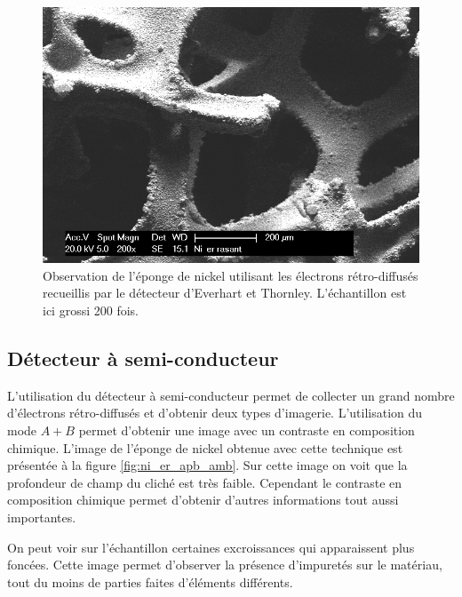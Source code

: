 \documentclass[a4paper,12pt]{article}
\newcommand\ett{Everhart et Thornley\xspace}
\begin{document}
\begin{figure}
\centering
\includegraphics[width = 0.7 \textwidth]{images/ni_er_rasant.png}
\caption{Observation de l'éponge de nickel utilisant les électrons rétro-diffusés recueillis par le détecteur d'\ett. L'échantillon est ici grossi 200 fois.}
\label{fig:ni_er_rasant}
\end{figure}


\subsection{Détecteur à semi-conducteur}

L'utilisation du détecteur à semi-conducteur permet de collecter un grand nombre d'électrons rétro-diffusés
et d'obtenir deux types d'imagerie. L'utilisation du mode $A+B$ permet d'obtenir une image avec un contraste
en composition chimique. L'image de l'éponge de nickel obtenue avec cette technique est présentée à la figure
\ref{fig:ni_er_apb_amb}. Sur cette image on voit que la profondeur de champ du cliché est très faible. Cependant
le contraste en composition chimique permet d'obtenir d'autres informations tout aussi importantes.

On peut voir sur l'échantillon certaines excroissances qui apparaissent plus foncées. Cette image permet d'observer
la présence d'impuretés sur le matériau, tout du moins de parties faites d'éléments différents.
\end{document}
